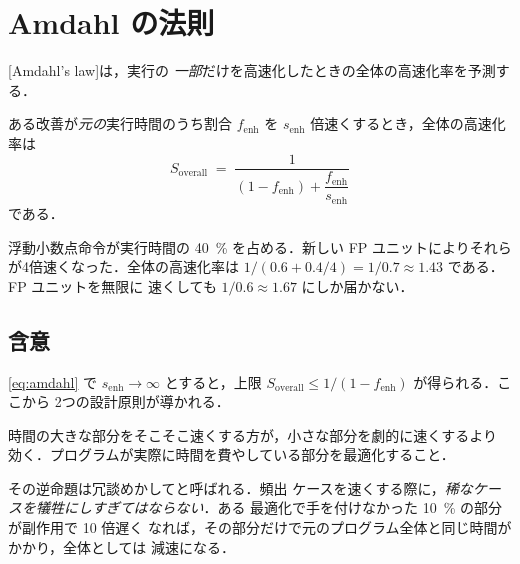\documentclass[../main.tex]{subfiles}
\begin{document}
\section{Amdahl の法則}

[Amdahl's law]は，実行の
\emph{一部}だけを高速化したときの全体の高速化率を予測する．

\begin{definition}
  ある改善が\emph{元の}実行時間のうち割合 $f_{\mathrm{enh}}$ を
  $s_{\mathrm{enh}}$ 倍速くするとき，全体の高速化率は
  \begin{equation}
    S_{\mathrm{overall}} \;=\;
    \frac{1}{(1 - f_{\mathrm{enh}}) + \dfrac{f_{\mathrm{enh}}}{s_{\mathrm{enh}}}}
    \label{eq:amdahl}
  \end{equation}
  である．
\end{definition}


\begin{example}
  浮動小数点命令が実行時間の \SI{40}{\percent} を占める．新しい FP
  ユニットによりそれらが4倍速くなった．全体の高速化率は
  $1/(0.6 + 0.4/4) = 1/0.7 \approx 1.43$ である．FP ユニットを無限に
  速くしても $1/0.6 \approx 1.67$ にしか届かない．
\end{example}

\subsection{含意}

\cref{eq:amdahl} で $s_{\mathrm{enh}} \to \infty$ とすると，上限
$S_{\mathrm{overall}} \le 1/(1-f_{\mathrm{enh}})$ が得られる．ここから
2つの設計原則が導かれる．

\begin{keypoint}[頻出ケースを速くせよ]
  時間の大きな部分をそこそこ速くする方が，小さな部分を劇的に速くするより
  効く．プログラムが実際に時間を費やしている部分を最適化すること．
\end{keypoint}

その逆命題は冗談めかしてと呼ばれる．頻出
ケースを速くする際に，\emph{稀なケースを犠牲にしすぎてはならない}．ある
最適化で手を付けなかった \SI{10}{\percent} の部分が副作用で 10 倍遅く
なれば，その部分だけで元のプログラム全体と同じ時間がかかり，全体としては
減速になる．
\end{document}
